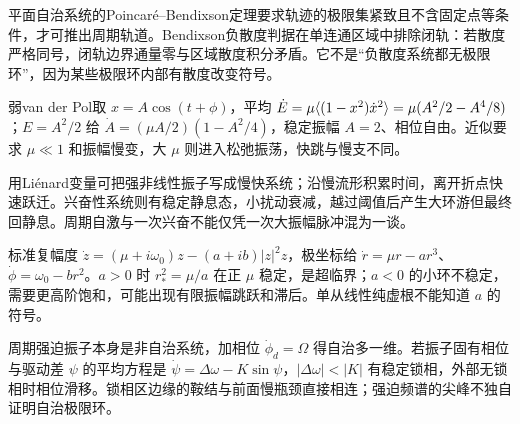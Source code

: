 平面自治系统的Poincar\'e--Bendixson定理要求轨迹的极限集紧致且不含固定点等条件，才可推出周期轨道。Bendixson负散度判据在单连通区域中排除闭轨：若散度严格同号，闭轨边界通量零与区域散度积分矛盾。它不是“负散度系统都无极限环”，因为某些极限环内部有散度改变符号。

弱van der Pol取 $x=A\cos(t+\phi)$，平均 $\dot E=\mu\langle (1-x^2)\dot x^2\rangle=\mu(A^2/2-A^4/8)$；$E=A^2/2$ 给 $\dot A=(\mu A/2)(1-A^2/4)$，稳定振幅 $A=2$、相位自由。近似要求 $\mu\ll1$ 和振幅慢变，大 $\mu$ 则进入松弛振荡，快跳与慢支不同。

用Liénard变量可把强非线性振子写成慢快系统；沿慢流形积累时间，离开折点快速跃迁。兴奋性系统则有稳定静息态，小扰动衰减，越过阈值后产生大环游但最终回静息。周期自激与一次兴奋不能仅凭一次大振幅脉冲混为一谈。

标准复幅度 $\dot z=(\mu+i\omega_0)z-(a+ib)|z|^2z$，极坐标给 $\dot r=\mu r-ar^3$、$\dot\phi=\omega_0-br^2$。$a>0$ 时 $r_*^2=\mu/a$ 在正 $\mu$ 稳定，是超临界；$a<0$ 的小环不稳定，需要更高阶饱和，可能出现有限振幅跳跃和滞后。单从线性纯虚根不能知道 $a$ 的符号。

周期强迫振子本身是非自治系统，加相位 $\dot\phi_d=\Omega$ 得自治多一维。若振子固有相位与驱动差 $\psi$ 的平均方程是 $\dot\psi=\Delta\omega-K\sin\psi$，$|\Delta\omega|<|K|$ 有稳定锁相，外部无锁相时相位滑移。锁相区边缘的鞍结与前面慢瓶颈直接相连；强迫频谱的尖峰不独自证明自治极限环。
